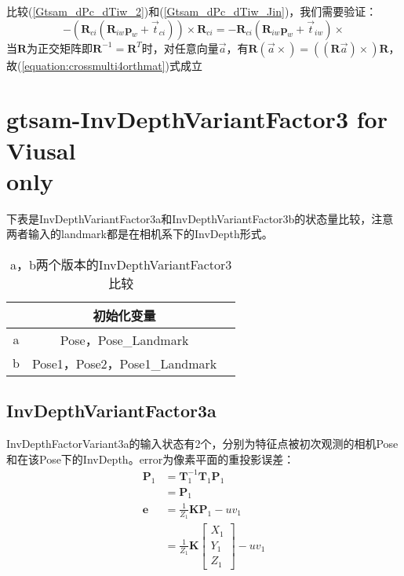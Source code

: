 \documentclass{article}
\begin{document}
比较(\ref{Gtsam_dPc_dTiw_2})和(\ref{Gtsam_dPc_dTiw_Jin})，我们需要验证：
\begin{equation} 
	-(\boldsymbol{R}_{ci}(\boldsymbol{R}_{iw}\boldsymbol{p}_w+ \vec{t}_{ci}))\times \boldsymbol{R}_{ci}=
	-\boldsymbol{R}_{ci}(\boldsymbol{R}_{iw}  \boldsymbol{p}_w+\vec{t}_{iw})\times 
	\label{equation:crossmulti4orthmat}
\end{equation} 
当$\boldsymbol{R}$为正交矩阵即$\boldsymbol{R}^{-1}=\boldsymbol{R}^T$时，对任意向量$\vec{a}$，有$\boldsymbol{R}(\vec{a}\times)=((\boldsymbol{R}\vec{a})\times)\boldsymbol{R}$，故(\ref{equation:crossmulti4orthmat})式成立
			
\section{gtsam-InvDepthVariantFactor3 for Viusal \\only}
下表是InvDepthVariantFactor3a和InvDepthVariantFactor3b的状态量比较，注意两者输入的landmark都是在相机系下的InvDepth形式。
\begin{table}[H]
	\caption{a，b两个版本的InvDepthVariantFactor3比较}
	\centering
	\begin{tabular}{ccc}
		\toprule
		\textbf{} & \textbf{初始化变量}        \\
		\midrule
		a         & Pose，Pose\_Landmark           \\
		b         & Pose1，Pose2，Pose1\_Landmark \\
		\bottomrule
	\end{tabular}
\end{table}

\subsection{InvDepthVariantFactor3a}
InvDepthFactorVariant3a的输入状态有2个，分别为特征点被初次观测的相机Pose和在该Pose下的InvDepth。error为像素平面的重投影误差：
\begin{equation}
	\begin{aligned}
		\boldsymbol{P}_1 & = \boldsymbol{T}_1^{-1}\boldsymbol{T}_1\boldsymbol{P}_1 \\&=
		\boldsymbol{P}_1 \\
		\boldsymbol{e}   & = \frac{1}{Z_1}\boldsymbol{K} \boldsymbol{P}_1-uv_1     \\&=
		\frac{1}{Z_1}\boldsymbol{K}                            
		\left[
		\begin{matrix}
		X_1 \\
		Y_1 \\
		Z_1
		\end{matrix}
		\right]-uv_1
	\end{aligned}
\end{equation}
\end{document}
